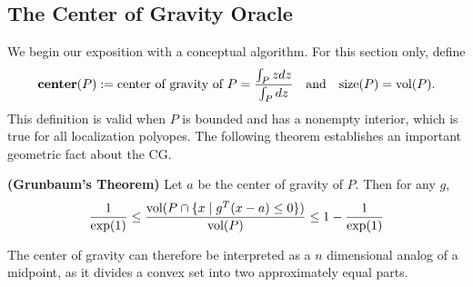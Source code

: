 
\subsection{The Center of Gravity Oracle} 

We begin our exposition with a conceptual algorithm. For this section
only, define
$$
\mbox{\bf center}(P) := \mbox{center of gravity of $P$} = \frac{\int_P z dz}{\int_P dz} \quad \mbox{and} \quad \mbox{size}(P) = \textnormal{vol}(P).
$$
This definition is valid when $P$ is bounded and has a nonempty interior,
which is true for all localization polyopes. The following theorem establishes
an important geometric fact about the CG.

\begin{thm} {\bf (Grunbaum's Theorem)} \label{thm:CG_cut} 
Let $a$ be the center of gravity of $P$. Then for any $g$,
$$
 \frac{1}{\exp(1)} \leq \frac{\textnormal{vol}(P \cap \{ x \mid g^T(x - a)\leq 0\}) }{\textnormal{vol}(P)} \leq 1- \frac{1}{\exp(1)} 
$$
\end{thm}

The center of gravity can therefore be interpreted as a $n$ dimensional analog
of a midpoint, as it divides a convex set into two approximately equal parts.

